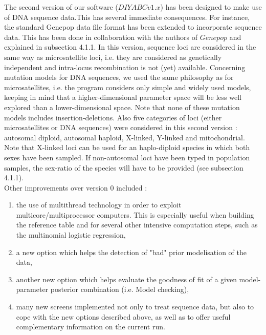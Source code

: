 \documentclass [a4paper]{report}
\begin{document}
The second version of our software ($DIYABC v1.x$) has been designed to make use of DNA sequence data.This has several immediate consequences. For instance, the standard Genepop data file format has been extended to incorporate sequence data. This has been done in collaboration with the authors of $Genepop$ and explained in  subsection 4.1.1. In this version, sequence loci are considered in the same way as microsatellite loci, i.e. they are considered as genetically independent and intra-locus recombination is not (yet) available. Concerning mutation models for DNA sequences, we used the same philosophy as for microsatellites, i.e. the program considers only simple and widely used models, keeping in mind that a higher-dimensional parameter space will be less well explored than a lower-dimensional space. Note that none of these mutation models includes insertion-deletions. 
Also five categories of loci (either microsatellites or DNA sequences) were considered in this second version : autosomal diploid, autosomal haploid, X-linked, Y-linked and mitochondrial. Note that X-linked loci can be used for an haplo-diploid species in which both sexes have been sampled. If non-autosomal loci have been typed in population samples, the sex-ratio of the species will have to be provided (see subsection 4.1.1).\\ 



Other improvements over version 0 included :
\begin{enumerate}
\item the use of multithread technology in order to exploit multicore/multiprocessor computers. This is especially useful when building the reference table and for several other intensive computation steps, such as the multinomial logistic regression,
\item a new option which helps the detection of "bad" prior modelisation of the data, 
\item another new option which helps evaluate the goodness of fit of a given model-parameter posterior combination (i.e. Model checking),   
\item many new screens implemented not only to treat sequence data, but also to cope with the new options described above, as well as to offer useful complementary information on the current run. 

\end{enumerate}
\end{document}
